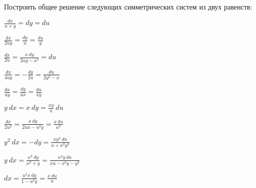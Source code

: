 	\vspace{10pt}
	
	Построить общее решение следующих симметрических систем из двух равенств:
	\begin{multicols}{2}
		\begin{enumtasks}

			\label{nonlinsys_systodes:symmetrical2}
			\item \( \frac{dx}{u + y} = dy = du \) 													%
			\item \( \frac{dx}{2uy} = \frac{dy}{u} = \frac{du}{y} \) 								%
			\item \( \frac{dx}{2u} = \frac{x ~ dy}{2uy - x^2} = du \) 								%
			\item \( \frac{dx}{4uy} = - \frac{dy}{2u} = \frac{du}{2y^2 - x} \) 						%
			\item \( \frac{dx}{uy} = \frac{dy}{ux} = \frac{du}{xy} \) 								%
			\item \( y ~ dx = x ~ dy = \frac{xy}{u} ~ du \) 										%
			\item \( \frac{dx}{2 u^{2}} = \frac{x ~ dy}{2ux - u^2 y} = \frac{x ~ du}{u^3} \) 		%
			\item \( y^2 ~ dx = - dy = \frac{x y^2 ~ du}{u + x^2 y^2} \) 							%
			\item \( y ~ dx = \frac{x^3 ~ dy}{x^2 + y} = \frac{x^2 y ~ du}{xu - x^2 y - y^2} \) 	%
			\item \( dx = \frac{u^2 x ~ dy}{1 - u^2 y} = \frac{x ~ du}{u} \) 						%


\end{enumtasks}
\end{multicols}
